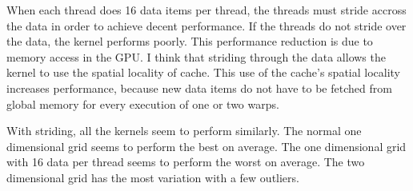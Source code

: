 \documentclass[a4paper,12pt]{article}
\begin{document}
  When each thread does 16 data items per thread, the threads must stride accross the data in order to achieve decent performance.
  If the threads do not stride over  the data, the kernel performs poorly.
  This performance reduction is due to memory access in the GPU.
  I think that striding through the data allows the kernel to use the spatial locality of cache.
  This use of the cache's spatial locality increases performance, because new data items do not have to be fetched from global memory for every execution of one or two warps.

  With striding, all the kernels seem to perform similarly.
  The normal one dimensional grid seems to perform the best on average.
  The one dimensional grid with 16 data per thread seems to perform the worst on average.
  The two dimensional grid has the most variation with a few outliers.
\end{document}
